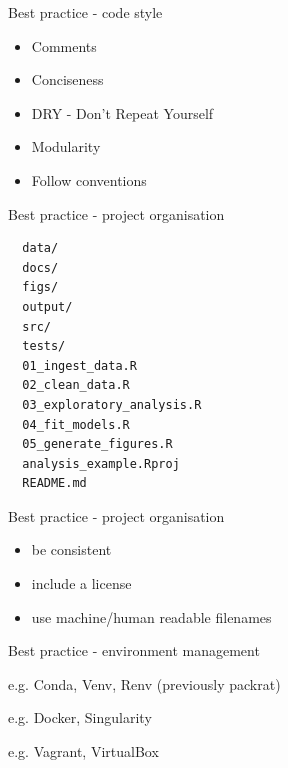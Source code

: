 \documentclass{beamer} %
\begin{document}
  \begin{frame}[label=BESTPRAC]{Best practice - code style}
    \pause
    \begin{itemize}
      \item Comments
      \item Conciseness
      \item DRY - Don't Repeat Yourself
      \item Modularity
      \item Follow conventions
    \end{itemize}
  \end{frame}

  \begin{frame}[fragile]{Best practice - project organisation}
        \small
        \begin{verbatim}
  data/
  docs/
  figs/
  output/
  src/
  tests/
  01_ingest_data.R
  02_clean_data.R
  03_exploratory_analysis.R
  04_fit_models.R
  05_generate_figures.R
  analysis_example.Rproj
  README.md\end{verbatim}
  \end{frame}

  \begin{frame}{Best practice - project organisation}
    \begin{itemize}
      \item be consistent
      \item include a license
      \item use machine/human readable filenames
    \end{itemize}
  \end{frame}


  \begin{frame}{Best practice - environment management}
    \begin{tcolorbox}[skin=beamer,adjusted title=Virtual environments]
      e.g. Conda, Venv, Renv (previously packrat)
    \end{tcolorbox}
    \begin{tcolorbox}[skin=beamer,adjusted title=Containers]
      e.g. Docker, Singularity
    \end{tcolorbox}
    \begin{tcolorbox}[skin=beamer,adjusted title=Virtual Machines]
      e.g. Vagrant,  VirtualBox
    \end{tcolorbox}    
  \end{frame}
\end{document}
